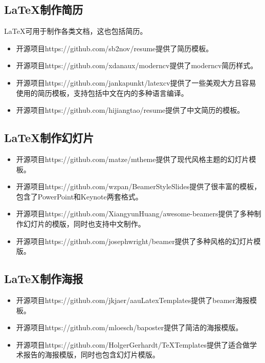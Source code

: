 \subsection{\LaTeX 制作简历}
LaTeX可用于制作各类文档，这也包括简历。

\begin{itemize}
      \item 开源项目https://github.com/sb2nov/resume提供了简历模板。
      \item 开源项目https://github.com/xdanaux/moderncv提供了moderncv简历样式。
      \item 开源项目https://github.com/jankapunkt/latexcv提供了一些美观大方且容易使用的简历模板，支持包括中文在内的多种语言编译。
      \item 开源项目https://github.com/hijiangtao/resume提供了中文简历的模板。
\end{itemize}

\subsection{\LaTeX 制作幻灯片}
\begin{itemize}
      \item 开源项目https://github.com/matze/mtheme提供了现代风格主题的幻灯片模板。
      \item 开源项目https://github.com/wzpan/BeamerStyleSlides提供了很丰富的模板，包含了PowerPoint和Keynote两套格式。
      \item 开源项目https://github.com/XiangyunHuang/awesome-beamers提供了多种制作幻灯片的模版，同时也支持中文制作。
      \item 开源项目https://github.com/josephwright/beamer提供了多种风格的幻灯片模版。
\end{itemize}

\subsection{\LaTeX 制作海报}
\begin{itemize}
      \item 开源项目https://github.com/jkjaer/aauLatexTemplates提供了beamer海报模板。
      \item 开源项目https://github.com/mloesch/baposter提供了简洁的海报模版。
      \item 开源项目https://github.com/HolgerGerhardt/TeXTemplates提供了适合做学术报告的海报模版，同时也包含幻灯片模版。
\end{itemize}

